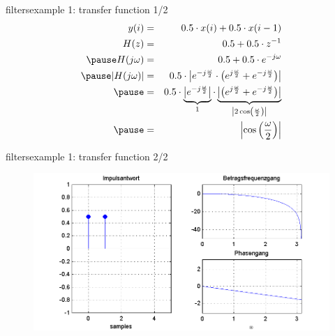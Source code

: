 	\begin{frame}{filters}{example 1: transfer function 1/2}
    	\begin{eqnarray*}
	        		y(i) &=& 0.5\cdot x(i) + 0.5\cdot x(i-1)\\
	        		H(z) &=& 0.5  + 0.5\cdot z^{-1}\\
	       	\pause
	        		H(j\omega) &=& 0.5  + 0.5\cdot e^{-j\omega}\\
	       	\pause
	       			|H(j\omega)| &=&0.5 \cdot \left| e^{-j\frac{\omega}{2}} \cdot \left( e^{j\frac{\omega}{2}} + e^{-j\frac{\omega}{2}}\right)\right| \\
	       	\pause
	       				&=&0.5 \cdot \underbrace{\left| e^{-j\frac{\omega}{2}}\right|}_{1} \cdot  \underbrace{\left|\left( e^{j\frac{\omega}{2}} + e^{-j\frac{\omega}{2}}\right)\right|}_{\left| 2\cos\left(\frac{\omega}{2}\right) \right|} \\
	       	\pause
	       	&=& \left| \cos\left(\frac{\omega}{2}\right) \right|
    	\end{eqnarray*}
	\end{frame}	
	
	\begin{frame}{filters}{example 1: transfer function 2/2}
		\begin{figure}
			\centerline{\includegraphics[scale=.5]{graph/fx_01}}
		    \label{fig:fx_01}
		\end{figure}
	\end{frame}	
	
